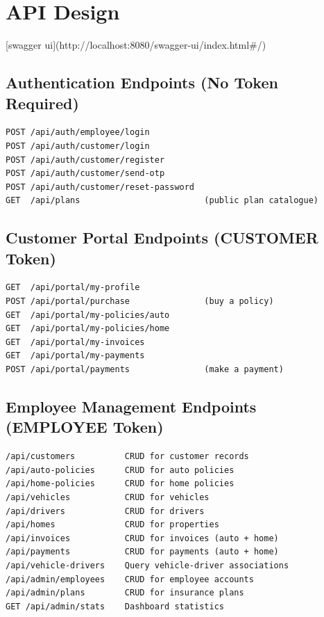 \documentclass[12pt,letterpaper]{article}
\begin{document}
\newpage

\section{API Design}
[swagger ui](http://localhost:8080/swagger-ui/index.html#/)
\subsection{Authentication Endpoints (No Token Required)}

\begin{lstlisting}[language={},numbers=none,caption={Public auth endpoints}]
POST /api/auth/employee/login
POST /api/auth/customer/login
POST /api/auth/customer/register
POST /api/auth/customer/send-otp
POST /api/auth/customer/reset-password
GET  /api/plans                         (public plan catalogue)
\end{lstlisting}

\subsection{Customer Portal Endpoints (CUSTOMER Token)}

\begin{lstlisting}[language={},numbers=none,caption={Customer self-service portal}]
GET  /api/portal/my-profile
POST /api/portal/purchase               (buy a policy)
GET  /api/portal/my-policies/auto
GET  /api/portal/my-policies/home
GET  /api/portal/my-invoices
GET  /api/portal/my-payments
POST /api/portal/payments               (make a payment)
\end{lstlisting}

\subsection{Employee Management Endpoints (EMPLOYEE Token)}

\begin{lstlisting}[language={},numbers=none,caption={Employee/admin management endpoints}]
/api/customers          CRUD for customer records
/api/auto-policies      CRUD for auto policies
/api/home-policies      CRUD for home policies
/api/vehicles           CRUD for vehicles
/api/drivers            CRUD for drivers
/api/homes              CRUD for properties
/api/invoices           CRUD for invoices (auto + home)
/api/payments           CRUD for payments (auto + home)
/api/vehicle-drivers    Query vehicle-driver associations
/api/admin/employees    CRUD for employee accounts
/api/admin/plans        CRUD for insurance plans
GET /api/admin/stats    Dashboard statistics
\end{lstlisting}
\end{document}
